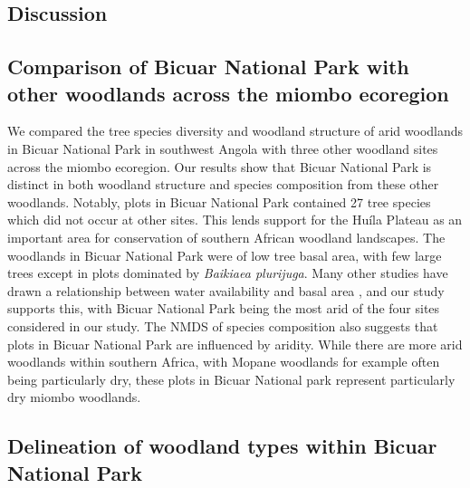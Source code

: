 \begin{refsection}

\section{Discussion}
\label{bicuar:sec:discussion}

\subsection{Comparison of Bicuar National Park with other woodlands across the miombo ecoregion}
\label{bicuar:ssec:miombo}

We compared the tree species diversity and woodland structure of arid woodlands in Bicuar National Park in southwest Angola with three other woodland sites across the miombo ecoregion. Our results show that Bicuar National Park is distinct in both woodland structure and species composition from these other woodlands. Notably, plots in Bicuar National Park contained 27 tree species which did not occur at other sites. This lends support for the Hu\'{i}la Plateau as an important area for conservation of southern African woodland landscapes. The woodlands in Bicuar National Park were of low tree basal area, with few large trees except in plots dominated by \textit{Baikiaea plurijuga}. Many other studies have drawn a relationship between water availability and basal area \citep{Terra2018, Strickland2016}, and our study supports this, with Bicuar National Park being the most arid of the four sites considered in our study. The NMDS of species composition also suggests that plots in Bicuar National Park are influenced by aridity. While there are more arid woodlands within southern Africa, with Mopane woodlands for example often being particularly dry, these plots in Bicuar National park represent particularly dry miombo woodlands.

\subsection{Delineation of woodland types within Bicuar National Park}
\label{bicuar:ssec:veg_type}


\end{refsection}
